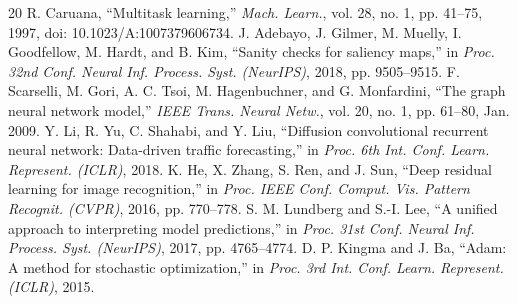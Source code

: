 \documentclass[conference]{IEEEtran}
\begin{document}
\begin{thebibliography}{20}
 R. Caruana, ``Multitask learning,'' \emph{Mach. Learn.}, vol. 28, no. 1, pp. 41--75, 1997, doi: 10.1023/A:1007379606734.
 J. Adebayo, J. Gilmer, M. Muelly, I. Goodfellow, M. Hardt, and B. Kim, ``Sanity checks for saliency maps,'' in \emph{Proc. 32nd Conf. Neural Inf. Process. Syst. (NeurIPS)}, 2018, pp. 9505--9515.
 F. Scarselli, M. Gori, A. C. Tsoi, M. Hagenbuchner, and G. Monfardini, ``The graph neural network model,'' \emph{IEEE Trans. Neural Netw.}, vol. 20, no. 1, pp. 61--80, Jan. 2009.
 Y. Li, R. Yu, C. Shahabi, and Y. Liu, ``Diffusion convolutional recurrent neural network: Data-driven traffic forecasting,'' in \emph{Proc. 6th Int. Conf. Learn. Represent. (ICLR)}, 2018.
 K. He, X. Zhang, S. Ren, and J. Sun, ``Deep residual learning for image recognition,'' in \emph{Proc. IEEE Conf. Comput. Vis. Pattern Recognit. (CVPR)}, 2016, pp. 770--778.
 S. M. Lundberg and S.-I. Lee, ``A unified approach to interpreting model predictions,'' in \emph{Proc. 31st Conf. Neural Inf. Process. Syst. (NeurIPS)}, 2017, pp. 4765--4774.
 D. P. Kingma and J. Ba, ``Adam: A method for stochastic optimization,'' in \emph{Proc. 3rd Int. Conf. Learn. Represent. (ICLR)}, 2015.
\end{thebibliography}
\end{document}
